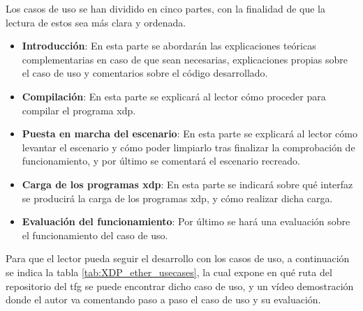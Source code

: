 Los casos de uso se han dividido en cinco partes, con la finalidad de que la lectura de estos sea más clara y ordenada.

\begin{itemize}
    \item \textbf{Introducción}: En esta parte se abordarán las explicaciones teóricas complementarias en caso de que sean necesarias, explicaciones propias sobre el caso de uso y comentarios sobre el código desarrollado.
    
    \item \textbf{Compilación}: En esta parte se explicará al lector cómo proceder para compilar el programa \gls{xdp}.
    
    \item \textbf{Puesta en marcha del escenario}: En esta parte se explicará al lector cómo levantar el escenario y cómo poder limpiarlo tras finalizar la comprobación de funcionamiento, y por último se comentará el escenario recreado. 
    \item \textbf{Carga de los programas \gls{xdp}}: En esta parte se indicará sobre qué interfaz se producirá la carga de los programas \gls{xdp}, y cómo realizar dicha carga.
    
    \item \textbf{Evaluación del funcionamiento}: Por último se hará una evaluación sobre el funcionamiento del caso de uso.
\end{itemize}

Para que el lector pueda seguir el desarrollo con los casos de uso, a continuación se indica la tabla \ref{tab:XDP_ether_usecases}, la cual expone en qué ruta del repositorio del \gls{tfg} se puede encontrar dicho caso de uso, y un vídeo demostración donde el autor va comentando paso a paso el caso de uso y su evaluación. 

